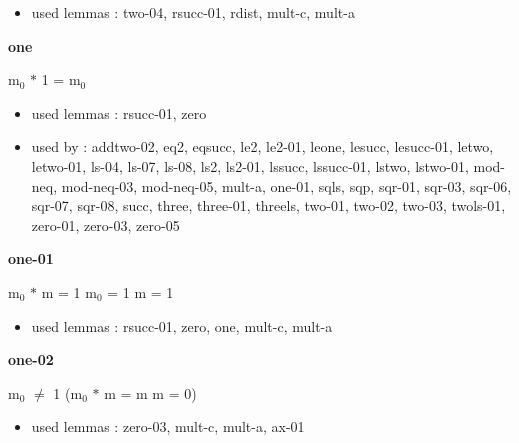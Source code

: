\documentclass[a4paper]{article}
\begin{document}
\begin{itemize}


\item       used lemmas  : two-04, rsucc-01, rdist, mult-c, mult-a

\end{itemize}

\medskip

\bigskip

{\large\bf one}

\medskip

 \Fol $\mbox{m}_{0}$ $*$ 1 = $\mbox{m}_{0}$

\begin{itemize}


\item       used lemmas  : rsucc-01, zero
\item       used by      : addtwo-02, eq2, eqsucc, le2, le2-01, leone, lesucc, lesucc-01, letwo, letwo-01, ls-04, ls-07, ls-08, ls2, ls2-01, lssucc, lssucc-01, lstwo, lstwo-01, mod-neq, mod-neq-03, mod-neq-05, mult-a, one-01, sqls, sqp, sqr-01, sqr-03, sqr-06, sqr-07, sqr-08, succ, three, three-01, threels, two-01, two-02, two-03, twols-01, zero-01, zero-03, zero-05

\end{itemize}

\medskip

\bigskip

{\large\bf one-01}

\medskip

 \Fol $\mbox{m}_{0}$ $*$ m = 1 \Equiv $\mbox{m}_{0}$ = 1 \And m = 1

\begin{itemize}


\item       used lemmas  : rsucc-01, zero, one, mult-c, mult-a

\end{itemize}

\medskip

\bigskip

{\large\bf one-02}

\medskip

 \Fol $\mbox{m}_{0}$ $\neq$ 1 \Imp ($\mbox{m}_{0}$ $*$ m = m \Equiv m = 0)

\begin{itemize}


\item       used lemmas  : zero-03, mult-c, mult-a, ax-01

\end{itemize}
\end{document}
